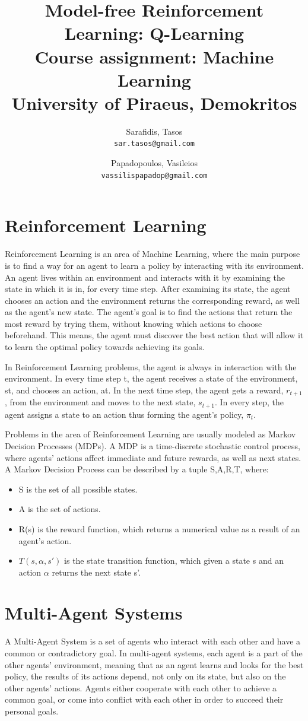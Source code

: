 \documentclass[10pt,a4paper,twocolumn]{article}
\title{%
		Model-free Reinforcement Learning: Q-Learning \\
	\large Course assignment: Machine Learning \\
			University of Piraeus, Demokritos}
\author{
	Sarafidis, Tasos\\
	\texttt{sar.tasos@gmail.com}
	\and
	Papadopoulos, Vasileios\\
	\texttt{vassilispapadop@gmail.com}
}
\begin{document}
	\maketitle
	
	\section{Reinforcement Learning}
	Reinforcement Learning is an area of Machine Learning, where the main purpose is to find a way for an agent to learn a policy by interacting with its environment. An agent lives within an environment and interacts with it by examining the state in which it is in, for every time step. After examining its state, the agent chooses an action and the environment returns the corresponding reward, as well as the agent’s new state. The agent’s goal is to find the actions that return the most reward by trying them, without knowing which actions to choose beforehand. This means, the agent must discover the best action that will allow it to learn the optimal policy towards achieving its goals.
	
	In Reinforcement Learning problems, the agent is always in interaction with the environment. In every time step t, the agent receives a state of the environment, st, and chooses an action, at. In the next time step, the agent gets a reward, $r_{t+1}$, from the environment and moves to the next state, $s_{t+1}$. In every step, the agent assigns a state to an action thus forming the agent’s policy, $\pi_{t}$.
	
	Problems in the area of Reinforcement Learning are usually modeled as Markov Decision Processes (MDPs). A MDP is a time-discrete stochastic control process, where agents’ actions affect immediate and future rewards, as well as next states. A Markov Decision Process can be described by a tuple {S,A,R,T}, where:
	
	\begin{itemize}
		\item S is the set of all possible states. 
		\item A is the set of actions.
		\item R(s) is the reward function, which returns a numerical value as a result of an agent’s action.
		\item $T(s,\alpha,s')$ is the state transition function, which given a state s and an action $\alpha$ returns the next state s'.
	\end{itemize}
	
	\section{Multi-Agent Systems}
	A Multi-Agent System is a set of agents who interact with each other and have a common or contradictory goal. In multi-agent systems, each agent is a part of the other agents’ environment, meaning that as an agent learns and looks for the best policy, the results of its actions depend, not only on its state, but also on the other agents’ actions. Agents either cooperate with each other to achieve a common goal, or come into conflict with each other in order to succeed their personal goals.
	
\end{document}

